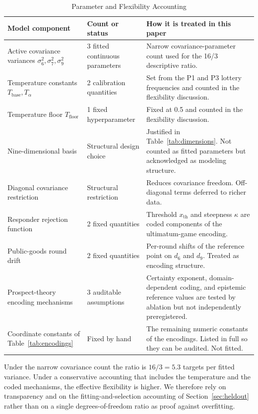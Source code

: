 \documentclass[journal]{IEEEtran}
\begin{document}
\begin{table}[!t]
\renewcommand{\arraystretch}{1.15}
\caption{Parameter and Flexibility Accounting}
\label{tab:param_accounting}
\centering
\begin{tabular}{p{} p{} p{}}
\toprule
\textbf{Model component} & \textbf{Count or status} & \textbf{How it is treated in this paper} \\
\midrule
Active covariance variances $\sigma_6^2,\sigma_7^2,\sigma_9^2$ & 3 fitted continuous parameters & Narrow covariance-parameter count used for the 16/3 descriptive ratio. \\
Temperature constants $T_{\text{base}},T_\alpha$ & 2 calibration quantities & Set from the P1 and P3 lottery frequencies and counted in the flexibility discussion. \\
Temperature floor $T_{\text{floor}}$ & 1 fixed hyperparameter & Fixed at 0.5 and counted in the flexibility discussion. \\
Nine-dimensional basis & Structural design choice & Justified in Table~\ref{tab:dimensions}. Not counted as fitted parameters but acknowledged as modeling structure. \\
Diagonal covariance restriction & Structural restriction & Reduces covariance freedom. Off-diagonal terms deferred to richer data. \\
Responder rejection function & 2 fixed quantities & Threshold $x_{\text{th}}$ and steepness $\kappa$ are coded components of the ultimatum-game encoding. \\
Public-goods round drift & 2 fixed quantities & Per-round shifts of the reference point on $d_6$ and $d_9$. Treated as encoding structure. \\
Prospect-theory encoding mechanisms & 3 auditable assumptions & Certainty exponent, domain-dependent coding, and epistemic reference values are tested by ablation but not independently preregistered. \\
Coordinate constants of Table~\ref{tab:encodings} & Fixed by hand & The remaining numeric constants of the encodings. Listed in full so they can be audited. Not fitted. \\
\bottomrule
\end{tabular}
\end{table}

Under the narrow covariance count the ratio is $16/3=5.3$ targets per fitted variance.
Under a conservative accounting that includes the temperature and the coded mechanisms, the effective flexibility is higher.
We therefore rely on transparency and on the fitting-and-selection accounting of Section~\ref{sec:heldout} rather than on a single degrees-of-freedom ratio as proof against overfitting.
\end{document}
